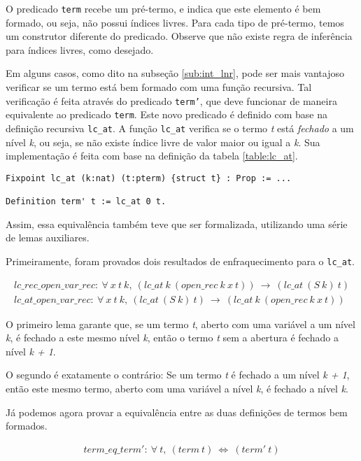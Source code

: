 O predicado \texttt{term} recebe um pré-termo, e indica que este elemento é bem
formado, ou seja, não possui índices livres. Para cada tipo de pré-termo, temos
um construtor diferente do predicado. Observe que não existe regra de inferência
para índices livres, como desejado.

Em alguns casos, como dito na subseção \ref{sub:int_lnr}, pode ser mais
vantajoso verificar se um termo está bem formado com uma função recursiva.
Tal verificação é feita através do predicado \texttt{term'}, que deve funcionar de
maneira equivalente ao predicado \texttt{term}. Este novo predicado é definido
com base na definição recursiva \texttt{lc\_at}. A função \texttt{lc\_at}
verifica se o termo \emph{t} está \textit{fechado} a um nível \emph{k}, ou seja,
se não existe índice livre de valor maior ou igual a \emph{k}. Sua implementação
é feita com base na definição da tabela \ref{table:lc_at}.

\begin{lstlisting}[basicstyle=\small]
Fixpoint lc_at (k:nat) (t:pterm) {struct t} : Prop := ...

Definition term' t := lc_at 0 t.
\end{lstlisting}

Assim, essa equivalência também teve que ser formalizada, utilizando uma série
de lemas auxiliares. 

Primeiramente, foram provados dois resultados de enfraquecimento para o
\texttt{lc\_at}.

\begin{gather}
 lc\_rec\_open\_var\_rec:\ \forall\ x\ t\ k,\ (lc\_at\ k\ (open\_rec\ k\ x\
    t))\ \rightarrow\ (lc\_at\ (S\ k)\ t) \nonumber \\
 lc\_at\_open\_var\_rec:\ \forall\ x\ t\ k,\ (lc\_at\ (S\ k)\ t)\ \rightarrow\
    (lc\_at\ k\ (open\_rec\ k\ x\ t)) \nonumber 
\end{gather}


O primeiro lema garante que, se um termo \emph{t}, aberto com uma variável a um
nível \emph{k}, é fechado a este mesmo nível \emph{k}, então o termo \emph{t}
sem a abertura é fechado a nível \emph{k + 1}.

O segundo é exatamente o contrário: Se um termo \emph{t} é fechado a um nível
\emph{k + 1}, então este mesmo termo, aberto com uma variável a nível \emph{k},
é fechado a nível \emph{k}.

Já podemos agora provar a equivalência entre as duas definições de termos bem
formados.

\begin{gather}
 term\_eq\_term':\ \forall\ t,\ (term\ t)\ \iff\ (term'\ t) \nonumber 
\end{gather}

